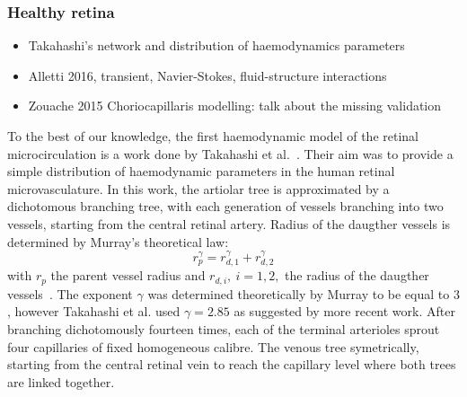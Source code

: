 \documentclass[12pt,a4paper]{article}
\begin{document}
\subsubsection{Healthy retina}
\begin{itemize}
\item Takahashi's network and distribution of haemodynamics parameters
\item Alletti 2016, transient, Navier-Stokes, fluid-structure interactions
\item Zouache 2015 Choriocapillaris modelling: talk about the missing validation
\end{itemize}

To the best of our knowledge, the first haemodynamic model of the retinal microcirculation is a work done by Takahashi et al.~\cite{Takahashi_2009}.
Their aim was to provide a simple distribution of haemodynamic parameters in the human retinal microvasculature.
In this work, the artiolar tree is approximated by a dichotomous branching tree, with each generation of vessels branching into two vessels, starting from the central retinal artery.
Radius of the daugther vessels is determined by Murray's theoretical law:
\begin{equation}
  \label{eq:MurrayLaw}
  r_p^\gamma = r_{d,1}^\gamma + r_{d,2}^\gamma
\end{equation}
with $r_p$ the parent vessel radius and $r_{d,i},~i=1,2,$ the radius of the daugther vessels~\cite{Murray_1926}.
The exponent $\gamma$ was determined theoretically by Murray to be equal to $3$, however Takahashi et al. used $\gamma=2.85$ as suggested by more recent work.
After branching dichotomously fourteen times, each of the terminal arterioles sprout four capillaries of fixed homogeneous calibre. 
The venous tree symetrically, starting from the central retinal vein to reach the capillary level where both trees are linked together.
\end{document}
